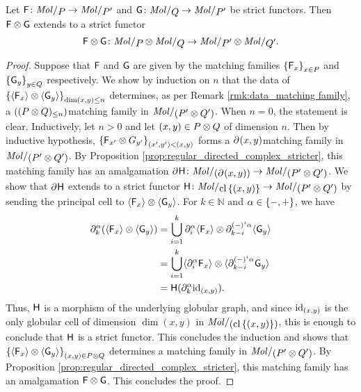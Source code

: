 \begin{lem} \label{lem:gray_of_strict_functors}
    Let \( \F \colon \molecin{P} \to \molecin{P'} \) and \( \G \colon \molecin{Q} \to \molecin{P'} \) be strict functors. 
    Then \( \F \gray \G \) extends to a strict functor 
    \begin{equation*}
        \F \gray \G \colon \molecin{P} \gray \molecin{Q} \to \molecin{P'} \gray \molecin{Q'}.
    \end{equation*}
\end{lem}
\begin{proof}
    Suppose that \( \F \) and \( \G \) are given by the matching families \( \set{\F_x}_{x \in P} \) and \( \set{\G_y}_{y \in Q} \) respectively.
    We show by induction on \( n \) that the data of \( \set{\pcell{\F_x} \gray \pcell{\G_y}}_{\dim (x, y) \le n} \) determines, as per Remark \ref{rmk:data_matching family}, a \( (\gr{\le n}{(P \gray Q)}) \)\nbd matching family in \( \molecin{(P' \gray Q')} \).
    When \( n = 0 \), the statement is clear. 
    Inductively, let \( n > 0 \) and let \( (x, y) \in P \gray Q \) of dimension \( n \). 
    Then by inductive hypothesis, \( \set{\F_{x'} \gray G_{y'}}_{(x', y') < (x, y)} \) forms a \( \bd{}{} (x, y) \)\nbd matching family in \( \molecin{(P' \gray Q')} \).
    By Proposition \ref{prop:regular_directed_complex_stricter}, this matching family has an amalgamation \( \bd{}{}\fun{H} \colon \molecin{(\bd{}{} (x, y))} \to \molecin{(P' \gray Q')} \).
    We show that \( \bd{}{} \fun{H} \) extends to a strict functor \( \fun{H} \colon \molecin{\clset{(x, y)}} \to \molecin{(P' \gray Q')} \) by sending the principal cell to \( \pcell{\F_x} \gray \pcell{\G_y} \).
    For \( k \in \mathbb{N} \) and \( \a \in \set{-, +} \), we have
    \begin{align*}
        \bd{k}{\a} (\pcell{\F_x} \gray \pcell{\G_y}) &= \bigcup_{i = 1}^k \bd{i}{\a} \pcell{\F_x} \gray \bd{k - i}{(-)^i\a} \pcell{\G_y} \\
                                       &= \bigcup_{i = 1}^k \pcell{\bd{i}{\a} \F_x} \gray \pcell{\bd{k - i}{(-)^i\a} \G_y} \\
                                       &= \fun{H}(\bd{k}{\a} \idd{(x, y)}).
    \end{align*}
    Thus, \( \fun{H} \) is a morphism of the underlying globular graph, and since \( \idd{(x, y)} \) is the only globular cell of dimension \( \dim (x, y) \) in \( \molecin{(\clset{(x, y)})} \), this is enough to conclude that \( \fun{H} \) is a strict functor.
    This concludes the induction and shows that \( \set{\pcell{\F_x} \gray \pcell{\G_y}}_{(x, y) \in P \gray Q} \) determines a matching family in \( \molecin{(P' \gray Q')} \).
    By Proposition \ref{prop:regular_directed_complex_stricter}, this matching family has an amalgamation \( \F \gray \G \).
    This concludes the proof.
\end{proof}

